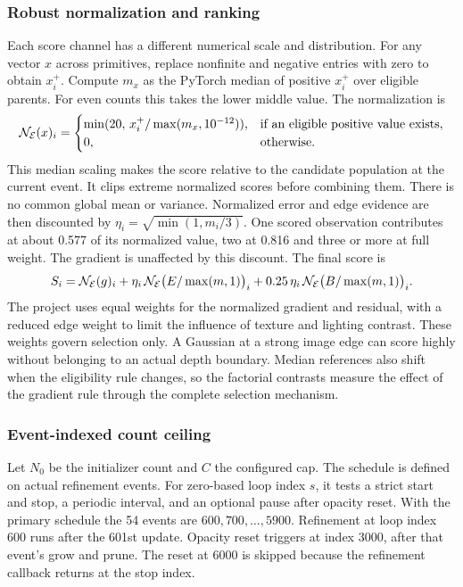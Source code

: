 \subsubsection{Robust normalization and ranking}
Each score channel has a different numerical scale and distribution. For any vector $x$ across primitives, replace nonfinite and negative entries with zero to obtain $x_i^+$. Compute $m_x$ as the PyTorch median of positive $x_i^+$ over eligible parents. For even counts this takes the lower middle value. The normalization is
\begin{equation}
 {\cal N}_{\mathcal E}(x)_i =
 \begin{cases}
  \min(20,\,x_i^+/\max(m_x,10^{-12})), &\text{if an eligible positive value exists},\\
  0, &\text{otherwise}.
 \end{cases}
\end{equation}
This median scaling makes the score relative to the candidate population at the current event. It clips extreme normalized scores before combining them. There is no common global mean or variance. Normalized error and edge evidence are then discounted by $\eta_i=\sqrt{\min(1,m_i/3)}$. One scored observation contributes at about 0.577 of its normalized value, two at 0.816 and three or more at full weight. The gradient is unaffected by this discount. The final score is
\begin{equation}
 S_i={\cal N}_{\mathcal E}(g)_i+
 \eta_i\,{\cal N}_{\mathcal E}\bigl(E/\max(m,1)\bigr)_i+
 0.25\,\eta_i\,{\cal N}_{\mathcal E}\bigl(B/\max(m,1)\bigr)_i .
 \label{eq:ranking}
\end{equation}
The project uses equal weights for the normalized gradient and residual, with a reduced edge weight to limit the influence of texture and lighting contrast. These weights govern selection only. A Gaussian at a strong image edge can score highly without belonging to an actual depth boundary. Median references also shift when the eligibility rule changes, so the factorial contrasts measure the effect of the gradient rule through the complete selection mechanism.

\subsubsection{Event-indexed count ceiling}
Let $N_0$ be the initializer count and $C$ the configured cap. The schedule is defined on actual refinement events. For zero-based loop index $s$, it tests a strict start and stop, a periodic interval, and an optional pause after opacity reset. With the primary schedule the 54 events are $600,700,\ldots,5900$. Refinement at loop index 600 runs after the 601st update. Opacity reset triggers at index 3000, after that event's grow and prune. The reset at 6000 is skipped because the refinement callback returns at the stop index.

